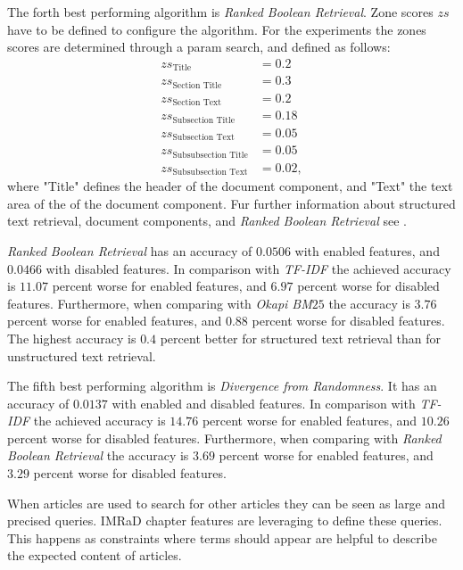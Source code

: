 The forth best performing algorithm is \textit{Ranked Boolean Retrieval}. Zone scores $zs$ have to be defined to configure the algorithm. For the experiments the zones scores are determined through a param search, and defined as follows:
\begin{align*}
  zs_{\text{Title}} & = 0.2                \nonumber \\
  zs_{\text{Section Title}} & = 0.3        \nonumber \\
  zs_{\text{Section Text}} & = 0.2         \nonumber \\
  zs_{\text{Subsection Title}} & = 0.18    \nonumber \\
  zs_{\text{Subsection Text}} & = 0.05     \nonumber \\
  zs_{\text{Subsubsection Title}} & =0.05  \nonumber \\
  zs_{\text{Subsubsection Text}} & = 0.02, \nonumber
\end{align*}
where "Title" defines the header of the document component, and "Text" the text area of the of the document component. Fur further information about structured text retrieval, document components, and \textit{Ranked Boolean Retrieval} see . 

\textit{Ranked Boolean Retrieval} has an accuracy of $0.0506$ with enabled features, and $0.0466$ with disabled features. In comparison with \textit{TF-IDF} the achieved accuracy is $11.07$ percent worse for enabled features, and $6.97$ percent worse for disabled features. Furthermore, when comparing with \textit{Okapi BM$25$} the accuracy is $3.76$ percent worse for enabled features, and $0.88$ percent worse for disabled features. The highest accuracy is $0.4$ percent better for structured text retrieval than for unstructured text retrieval.

The fifth best performing algorithm is \textit{Divergence from Randomness}. It has an accuracy of $0.0137$ with enabled and disabled features. In comparison with \textit{TF-IDF} the achieved accuracy is $14.76$ percent worse for enabled features, and $10.26$ percent worse for disabled features. Furthermore, when comparing with \textit{Ranked Boolean Retrieval} the accuracy is $3.69$ percent worse for enabled features, and $3.29$ percent worse for disabled features. 

When articles are used to search for other articles they can be seen as large and precised queries. IMRaD chapter features are leveraging to define these queries. This happens as constraints where terms should appear are helpful to describe the expected content of articles.


